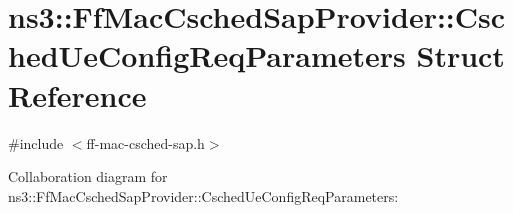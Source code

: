 \hypertarget{structns3_1_1FfMacCschedSapProvider_1_1CschedUeConfigReqParameters}{}\section{ns3\+:\+:Ff\+Mac\+Csched\+Sap\+Provider\+:\+:Csched\+Ue\+Config\+Req\+Parameters Struct Reference}
\label{structns3_1_1FfMacCschedSapProvider_1_1CschedUeConfigReqParameters}


{\ttfamily \#include $<$ff-\/mac-\/csched-\/sap.\+h$>$}



Collaboration diagram for ns3\+:\+:Ff\+Mac\+Csched\+Sap\+Provider\+:\+:Csched\+Ue\+Config\+Req\+Parameters\+:

